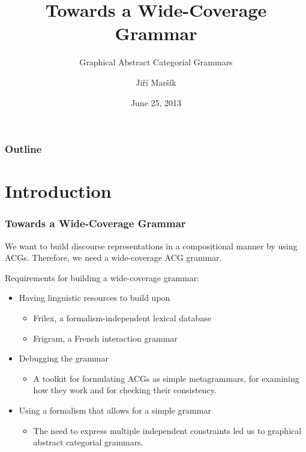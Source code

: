 \documentclass{beamer}
\begin{document}
\title[G-ACGs]{Towards a Wide-Coverage Grammar}
\subtitle{Graphical Abstract Categorial Grammars}
\author{Ji\v{r}\'{i} Mar\v{s}\'{i}k}
\date[June 2013]{June 25, 2013}

\frame{\titlepage \setcounter{framenumber}{1}}

\begin{frame}
\frametitle{Outline}
\tableofcontents
\end{frame}

\section{Introduction}

\begin{frame}
  \frametitle{Towards a Wide-Coverage Grammar}

  We want to build discourse representations in a compositional manner
  by using ACGs. Therefore, we need a wide-coverage ACG grammar.

  \vspace{3 mm}

  Requirements for building a wide-coverage grammar:
    \begin{itemize}
    \item Having linguistic resources to build upon
      \begin{itemize}
      \item Frilex, a formalism-independent lexical database
      \item Frigram, a French interaction grammar
      \end{itemize}
    \item Debugging the grammar
      \begin{itemize}
        \item A toolkit for formulating ACGs as simple metagrammars, for
          examining how they work and for checking their consistency.
      \end{itemize}
    \item Using a formalism that allows for a simple grammar
      \begin{itemize}
      \item The need to express multiple independent constraints led us
        to graphical abstract categorial grammars.
      \end{itemize}
    \end{itemize}
\end{frame}
\end{document}
